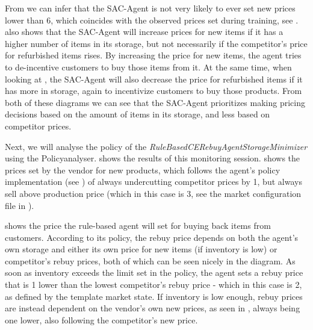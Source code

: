 From  we can infer that the SAC-Agent is not very likely to ever set new prices lower than 6, which coincides with the observed prices set during training, see .  also shows that the SAC-Agent will increase prices for new items if it has a higher number of items in its storage, but not necessarily if the competitor's price for refurbished items rises. By increasing the price for new items, the agent tries to de-incentive customers to buy those items from it. At the same time, when looking at , the SAC-Agent will also decrease the price for refurbished items if it has more in storage, again to incentivize customers to buy those products. From both of these diagrams we can see that the SAC-Agent prioritizes making pricing decisions based on the amount of items in its storage, and less based on competitor prices.

Next, we will analyse the policy of the \emph{RuleBasedCERebuyAgentStorageMinimizer} using the Policyanalyser.  shows the results of this monitoring session.  shows the prices set by the vendor for new products, which follows the agent's policy implementation (see ) of always undercutting competitor prices by 1, but always sell above production price (which in this case is 3, see the market configuration file in ).

 shows the price the rule-based agent will set for buying back items from customers. According to its policy, the rebuy price depends on both the agent's own storage and either its own price for new items (if inventory is low) or competitor's rebuy prices, both of which can be seen nicely in the diagram. As soon as inventory exceeds the limit set in the policy, the agent sets a rebuy price that is 1 lower than the lowest competitor's rebuy price - which in this case is 2, as defined by the template market state. If inventory is low enough, rebuy prices are instead dependent on the vendor's own new prices, as seen in , always being one lower, also following the competitor's new price.

